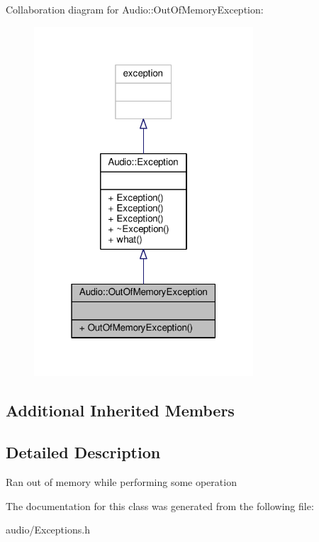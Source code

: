 Collaboration diagram for Audio\+:\+:Out\+Of\+Memory\+Exception\+:
\nopagebreak
\begin{figure}[H]
\begin{center}
\leavevmode
\includegraphics[width=232pt]{d9/dc4/classAudio_1_1OutOfMemoryException__coll__graph}
\end{center}
\end{figure}
\subsection*{Additional Inherited Members}


\subsection{Detailed Description}
Ran out of memory while performing some operation 

The documentation for this class was generated from the following file\+:\begin{DoxyCompactItemize}
\item 
audio/Exceptions.\+h\end{DoxyCompactItemize}
